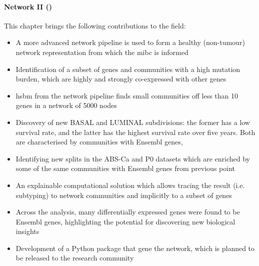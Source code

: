 \paragraph*{Network II ()}

This chapter brings the following contributions to the field:
\begin{itemize}
    \item A more advanced network pipeline is used to form a healthy (non-tumour) network representation from which the \acrshort{mibc} is informed
    \item Identification of a subset of genes and communities with a high mutation burden, which are highly and strongly co-expressed with other genes
    \item \acrfull{hsbm} from the network pipeline finds small communities off less than 10 genes in a network of 5000 nodes
    \item Discovery of new \gls{BASAL} and \gls{LUMINAL} subdivisions: the former has a low survival rate, and the latter has the highest survival rate over five years. Both are characterised by communities with Ensembl genes,
    \item Identifying new splits in the ABS-Ca and P0 datasets which are enriched by some of the same communities with Ensembl genes from previous point 
    \item An explainable computational solution which allows tracing the result (i.e. subtyping) to network communities and implicitly to a subset of genes
    \item Across the analysis, many differentially expressed genes were found to be Ensembl genes, highlighting the potential for discovering new biological insights
    \item Development of a Python package that gene the network, which is planned to be released to the research community
\end{itemize}